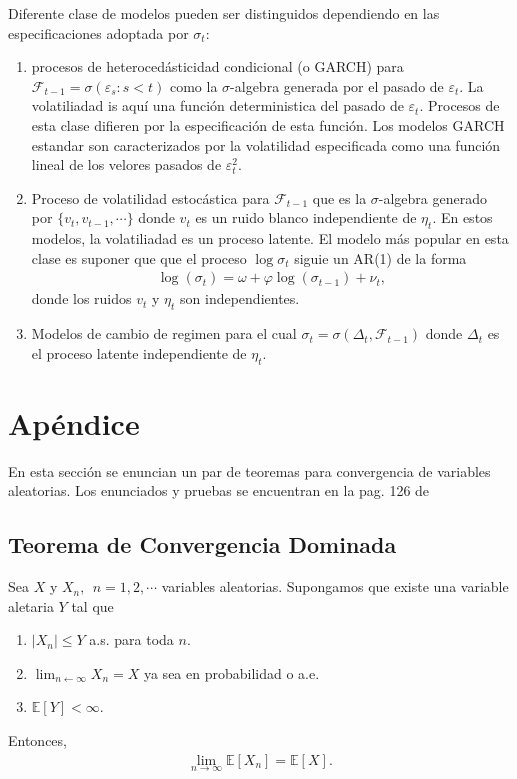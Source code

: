 \documentclass[a4paper, 11pt]{article}
\begin{document}
Diferente clase de modelos pueden ser distinguidos dependiendo en las especificaciones adoptada por $\sigma_t$:
\begin{enumerate}
  \item procesos de heterocedásticidad condicional (o GARCH) para $\mathcal{F}_{t-1} = \sigma(\varepsilon_s: s<t)$ como la $\sigma$-algebra generada por el pasado de $\varepsilon_t$. La volatiliadad is aquí una función deterministica del pasado de $\varepsilon_t$. Procesos de esta clase difieren por la especificación de esta función. Los modelos GARCH estandar son caracterizados por la volatilidad especificada como una función lineal de los velores pasados de $\varepsilon_t^2$. 
  \item Proceso de volatilidad estocástica para $\mathcal{F}_{t-1}$ que es la $\sigma$-algebra generado por $\{v_t,v_{t-1},\cdots\}$ donde $v_t$ es un ruido blanco independiente de $\eta_t$. En estos modelos, la volatiliadad es un proceso latente. El modelo más popular en esta clase es suponer que que el proceso $\log \sigma_t$ siguie un AR(1) de la forma
  \begin{align*}
    \log(\sigma_t ) = \omega + \varphi \log(\sigma_{t-1}) + \nu_t,
  \end{align*}
  donde los ruidos $v_t$ y $\eta_t$ son independientes.
  \item Modelos de cambio de regimen para el cual $\sigma_t = \sigma(\Delta_t, \mathcal{F}_{t-1})$ donde $\Delta_t$ es el proceso latente independiente de $\eta_t$.
\end{enumerate}

\section{Apéndice}

En esta sección se enuncian un par de teoremas para convergencia de variables aleatorias. Los enunciados y pruebas se encuentran en la pag. 126 de \cite{Walsh}

\subsection{Teorema de Convergencia Dominada}

Sea $X$ y $X_n, \:\: n = 1,2,\cdots$ variables aleatorias. Supongamos que existe una variable aletaria $Y$ tal que
\begin{enumerate}
  \item $|X_n| \leq Y$ a.s. para toda $n$.
  \item $\lim_{n\leftarrow \infty} X_n  = X $ ya sea en probabilidad o a.e.
  \item $\mathbb{E}\left [Y  \right ] < \infty$.
\end{enumerate}
Entonces,
\begin{align*}
  \lim_{n\rightarrow\infty} \mathbb{E}\left [X_n  \right ] = \mathbb{E}\left [X   \right ].
\end{align*}
\end{document}
